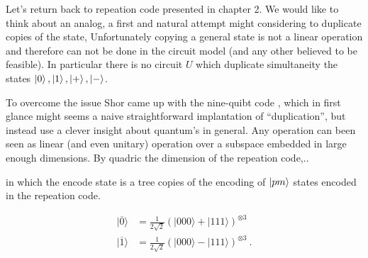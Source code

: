 Let's return back to repeation code presented in chapter 2. We would like to think about an analog, a first and natural attempt might considering to duplicate copies of the state, Unfortunately copying a general state is not a linear operation and therefore can not be done in the circuit model (and any other believed to be feasible). In particular there is no circuit $U$ which duplicate simultaneity the states $\ket{0}, \ket{1}, \ket{+}, \ket{-}$.

To overcome the issue Shor came up with the nine-quibt code \cite{Ninequ}, which in first glance might seems a naive straightforward implantation of ``duplication'', but instead use a clever insight about quantum's in general. Any operation can been seen as linear (and even unitary) operation over a subspace embedded in large enough dimensions. By quadric the dimension of the repeation code,..    

in which the encode state is a tree copies of the encoding of $\ket{pm}$ states  encoded in the repeation code.   


\begin{equation*}
  \begin{split}
    |\overline{0}\rangle&=\frac{1}{2\sqrt{2}}\left(|000\rangle+|111\rangle\right)^{\otimes3}\\
    |\overline{1}\rangle&=\frac{1}{2\sqrt{2}}\left(|000\rangle-|111\rangle\right)^{\otimes3}~.
  \end{split}
\end{equation*}

